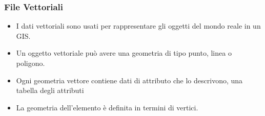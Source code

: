 \documentclass{beamer}
\begin{document}
{\begin{frame}
   \frametitle{File Vettoriali}
   \begin{itemize}
            \item  I dati vettoriali sono usati per rappresentare gli oggetti del mondo reale in un GIS.
            \item Un oggetto vettoriale può avere una geometria di tipo punto, linea o poligono.
            \item Ogni geometria vettore contiene dati di attributo che lo descrivono, una tabella degli attributi
            \item La geometria dell’elemento è definita in termini di vertici.
             \end{itemize}       
\end{frame}


}
\end{document}
